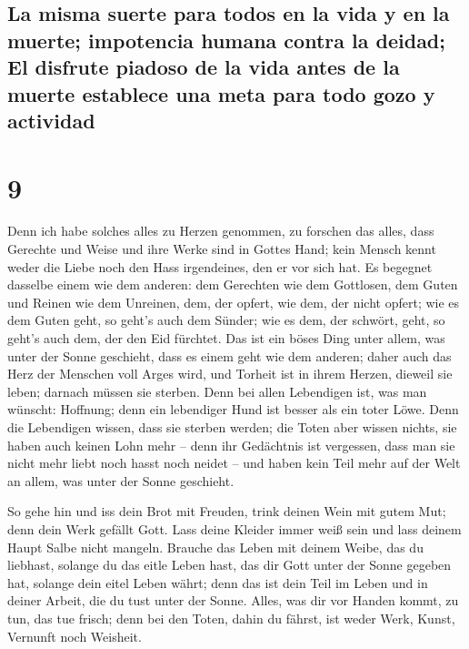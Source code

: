 \hypertarget{la-misma-suerte-para-todos-en-la-vida-y-en-la-muerte-impotencia-humana-contra-la-deidad-el-disfrute-piadoso-de-la-vida-antes-de-la-muerte-establece-una-meta-para-todo-gozo-y-actividad}{%
\subsection{La misma suerte para todos en la vida y en la muerte;
impotencia humana contra la deidad; El disfrute piadoso de la vida antes
de la muerte establece una meta para todo gozo y
actividad}\label{la-misma-suerte-para-todos-en-la-vida-y-en-la-muerte-impotencia-humana-contra-la-deidad-el-disfrute-piadoso-de-la-vida-antes-de-la-muerte-establece-una-meta-para-todo-gozo-y-actividad}}

\hypertarget{section-8}{%
\section{9}\label{section-8}}

 Denn ich habe solches alles zu Herzen genommen, zu
forschen das alles, dass Gerechte und Weise und ihre Werke sind in
Gottes Hand; kein Mensch kennt weder die Liebe noch den Hass
irgendeines, den er vor sich hat.  Es begegnet dasselbe
einem wie dem anderen: dem Gerechten wie dem Gottlosen, dem Guten und
Reinen wie dem Unreinen, dem, der opfert, wie dem, der nicht opfert; wie
es dem Guten geht, so geht's auch dem Sünder; wie es dem, der schwört,
geht, so geht's auch dem, der den Eid fürchtet.  Das ist
ein böses Ding unter allem, was unter der Sonne geschieht, dass es einem
geht wie dem anderen; daher auch das Herz der Menschen voll Arges wird,
und Torheit ist in ihrem Herzen, dieweil sie leben; darnach müssen sie
sterben.  Denn bei allen Lebendigen ist, was man wünscht:
Hoffnung; denn ein lebendiger Hund ist besser als ein toter Löwe.
 Denn die Lebendigen wissen, dass sie sterben werden; die
Toten aber wissen nichts, sie haben auch keinen Lohn mehr -- denn ihr
Gedächtnis ist vergessen,  dass man sie nicht mehr liebt
noch hasst noch neidet -- und haben kein Teil mehr auf der Welt an
allem, was unter der Sonne geschieht.

 So gehe hin und iss dein Brot mit Freuden, trink deinen
Wein mit gutem Mut; denn dein Werk gefällt Gott.  Lass
deine Kleider immer weiß sein und lass deinem Haupt Salbe nicht mangeln.
 Brauche das Leben mit deinem Weibe, das du liebhast,
solange du das eitle Leben hast, das dir Gott unter der Sonne gegeben
hat, solange dein eitel Leben währt; denn das ist dein Teil im Leben und
in deiner Arbeit, die du tust unter der Sonne.  Alles,
was dir vor Handen kommt, zu tun, das tue frisch; denn bei den Toten,
dahin du fährst, ist weder Werk, Kunst, Vernunft noch Weisheit.

